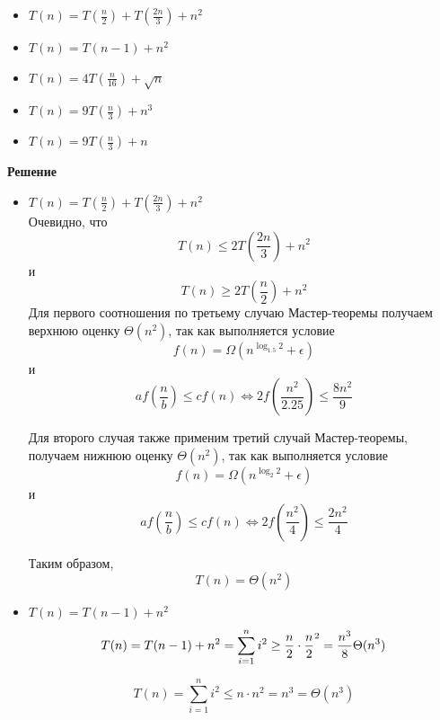 \documentclass{article}
\begin{document}
\begin{itemize}
    \item $T(n) = T(\frac{n}{2}) + T(\frac{2n}{3}) + n^2$
    \item $T(n) = T(n - 1) + n^2$
    \item $T(n) = 4 T(\frac{n}{16}) + \sqrt{n}$
    \item $T(n) = 9 T(\frac{n}{3}) + n^3$
    \item $T(n) = 9 T(\frac{n}{3}) + n$
\end{itemize}

\medskip

\textbf{Решение}

\begin{itemize}
    \item $T(n) = T(\frac{n}{2}) + T(\frac{2n}{3}) + n^2$ \\

          Очевидно, что
          \[
              T(n) \leq 2T(\frac{2n}{3}) + n^2
          \]
          и \[
              T(n) \geq 2T(\frac{n}{2}) + n^2
          \]
          Для первого соотношения по третьему случаю
          Мастер-теоремы
          получаем верхнюю оценку $\Theta(n^2)$, так как выполняется
          условие
          \[
              f(n) = \Omega(n^{\log_{1.5} 2} + \epsilon)
          \]
          и
          \[
              af(\frac{n}{b}) \leq cf(n) \Longleftrightarrow
              2f(\frac{n^2}{2.25}) \leq \frac{8n^2}{9}
          \]

          Для второго случая также применим третий случай Мастер-теоремы,
          получаем нижнюю оценку $\Theta(n^2)$, так как выполняется
          условие
          \[
              f(n) = \Omega(n^{\log_{2} 2} + \epsilon)
          \]
          и
          \[
              af(\frac{n}{b}) \leq cf(n) \Longleftrightarrow
              2f(\frac{n^2}{4}) \leq \frac{2n^2}{4}
          \]

          Таким образом,
          \[
              T(n) = \Theta(n^2)
          \]

    \item $T(n) = T(n - 1) + n^2$ \\

          \[
              T(n) = T(n - 1) + n^2 =
              \sum_{i=1}^{n} i^2 \geq
              \frac{n}{2} \cdot \frac{n}{2}^2 =
              \frac{n^3}{8} \Theta(n^3) \\
          \]

          \[
              T(n) = \sum_{i=1}^{n} i^2 \leq
              n \cdot n^2 = n^3 = \Theta(n^3)
          \]


\end{itemize}
\end{document}
